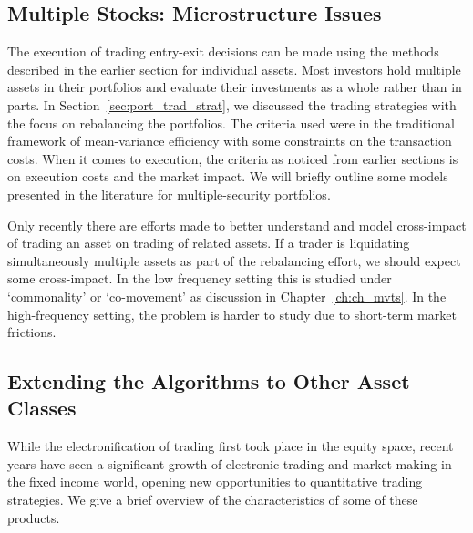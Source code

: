 \subsection{Multiple Stocks: Microstructure Issues}


The execution of trading entry-exit decisions can be made using the methods described in the earlier section for individual assets. Most investors hold multiple assets in their portfolios and evaluate their investments as a whole rather than in parts. In Section~\ref{sec:port_trad_strat}, we discussed the trading strategies with the focus on rebalancing the portfolios. The criteria used were in the traditional framework of mean-variance efficiency with some constraints on the transaction costs. When it comes to execution, the criteria as noticed from earlier sections is on execution costs and the market impact. We will briefly outline some models presented in the literature for multiple-security portfolios.


Only recently there are efforts made to better understand and model cross-impact of trading an asset on trading of related assets. If a trader is liquidating simultaneously multiple assets as part of the rebalancing effort, we should expect some cross-impact. In the low frequency setting this is studied under `commonality' or `co-movement' as discussion in Chapter~\ref{ch:ch_mvts}. In the high-frequency setting, the problem is harder to study due to short-term market frictions. 



\subsection{Extending the Algorithms to Other Asset Classes}


While the electronification of trading first took place in the equity space, recent years have seen a significant growth of electronic trading and market making in the fixed income world, opening new opportunities to quantitative trading strategies. We give a brief overview of the characteristics of some of these products. 


